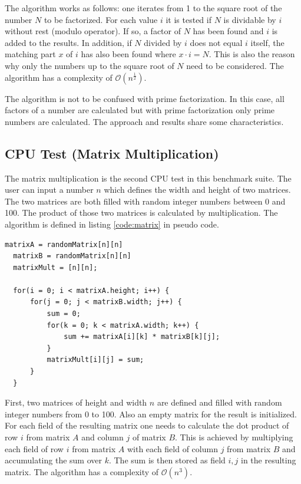 The algorithm works as follows: one iterates from 1 to the square root of the number $N$ to be factorized. For each value $i$ it is tested if $N$ is dividable by $i$ without rest (modulo operator). If so, a factor of $N$ has been found and $i$ is added to the results. In addition, if $N$ divided by $i$ does not equal $i$ itself, the matching part $x$ of $i$ has also been found where $x \cdot i = N$. This is also the reason why only the numbers up to the square root of $N$ need to be considered. The algorithm has a complexity of $\mathcal{O}(n^{\frac{1}{2}})$.

\begin{remark}
The algorithm is not to be confused with prime factorization. In this case, all factors of a number are calculated but with prime factorization only prime numbers are calculated. The approach and results share some characteristics.
\end{remark}

\subsection{CPU Test (Matrix Multiplication)}
The matrix multiplication is the second \gls{CPU} test in this benchmark suite. The user can input a number $n$ which defines the width and height of two matrices. The two matrices are both filled with random integer numbers between 0 and 100. The product of those two matrices is calculated by multiplication. The algorithm is defined in listing \ref{code:matrix} in pseudo code.

\begin{minipage}{\linewidth}
\begin{lstlisting}[frame=single,caption={Matrix multiplication test pseudo code},label=code:matrix,linewidth=0.8\textwidth,xleftmargin=.2\textwidth]
  matrixA = randomMatrix[n][n]
  matrixB = randomMatrix[n][n]
  matrixMult = [n][n];
  
  for(i = 0; i < matrixA.height; i++) {
      for(j = 0; j < matrixB.width; j++) {
          sum = 0;
          for(k = 0; k < matrixA.width; k++) {
              sum += matrixA[i][k] * matrixB[k][j];
          }
          matrixMult[i][j] = sum;
      }
  }
\end{lstlisting}
\end{minipage}
\newline

First, two matrices of height and width $n$ are defined and filled with random integer numbers from 0 to 100. Also an empty matrix for the result is initialized. For each field of the resulting matrix one needs to calculate the dot product of row $i$ from matrix $A$ and column $j$ of matrix $B$. This is achieved by multiplying each field of row $i$ from matrix $A$ with each field of column $j$ from matrix $B$ and accumulating the sum over $k$. The sum is then stored as field $i,j$ in the resulting matrix. The algorithm has a complexity of $\mathcal{O}(n^{3})$.

